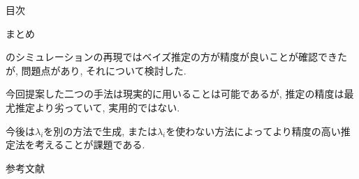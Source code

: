 \documentclass[12pt,dvipdfmx]{beamer}
\begin{document}
\begin{frame}
{\large 目次}
\tableofcontents[currentsection]
\end{frame}

\begin{frame}{まとめ}

\cite{Lomax2020}のシミュレーションの再現ではベイズ推定の方が精度が良いことが確認できたが, 問題点があり, それについて検討した. 

今回提案した二つの手法は現実的に用いることは可能であるが, 推定の精度は最尤推定より劣っていて, 実用的ではない. 

今後は$\lambda_i$を別の方法で生成, または$\lambda_i$を使わない方法によってより精度の高い推定法を考えることが課題である.

\end{frame}





\begin{frame}{参考文献}


\end{frame}
\end{document}

